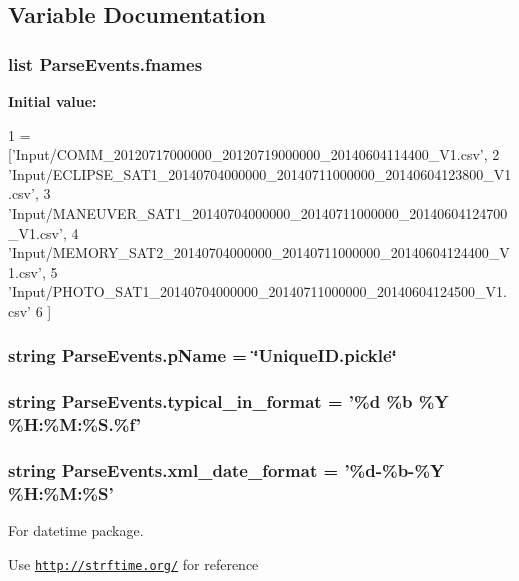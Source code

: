 \subsection{Variable Documentation}
\hypertarget{namespace_parse_events_a6718feae9a406aaacf93b9b39b2c8ff6}{
\subsubsection[{fnames}]{\setlength{\rightskip}{0pt plus 5cm}list Parse\-Events.\-fnames}}\label{namespace_parse_events_a6718feae9a406aaacf93b9b39b2c8ff6}
{\bfseries Initial value\-:}
\begin{DoxyCode}
1 = [\textcolor{stringliteral}{'Input/COMM\_20120717000000\_20120719000000\_20140604114400\_V1.csv'},
2                   \textcolor{stringliteral}{'Input/ECLIPSE\_SAT1\_20140704000000\_20140711000000\_20140604123800\_V1.csv'},
3                   \textcolor{stringliteral}{'Input/MANEUVER\_SAT1\_20140704000000\_20140711000000\_20140604124700\_V1.csv'},
4                   \textcolor{stringliteral}{'Input/MEMORY\_SAT2\_20140704000000\_20140711000000\_20140604124400\_V1.csv'},
5                   \textcolor{stringliteral}{'Input/PHOTO\_SAT1\_20140704000000\_20140711000000\_20140604124500\_V1.csv'}
6                   ]
\end{DoxyCode}
\hypertarget{namespace_parse_events_a8b2cf86e813095d3510145693bd3e7e1}{
\subsubsection[{p\-Name}]{\setlength{\rightskip}{0pt plus 5cm}string Parse\-Events.\-p\-Name = \char`\"{}Unique\-I\-D.\-pickle\char`\"{}}}\label{namespace_parse_events_a8b2cf86e813095d3510145693bd3e7e1}
\hypertarget{namespace_parse_events_a0bec8d6d94e659314b932dd430a34eec}{
\subsubsection[{typical\-\_\-in\-\_\-format}]{\setlength{\rightskip}{0pt plus 5cm}string Parse\-Events.\-typical\-\_\-in\-\_\-format = '\%d \%b \%Y \%H\-:\%M\-:\%S.\%f'}}\label{namespace_parse_events_a0bec8d6d94e659314b932dd430a34eec}
\hypertarget{namespace_parse_events_ad3060b0ae7817a67b335de758c4363ac}{
\subsubsection[{xml\-\_\-date\-\_\-format}]{\setlength{\rightskip}{0pt plus 5cm}string Parse\-Events.\-xml\-\_\-date\-\_\-format = '\%d-\/\%b-\/\%Y \%H\-:\%M\-:\%S'}}\label{namespace_parse_events_ad3060b0ae7817a67b335de758c4363ac}


For datetime package. 

Use \href{http://strftime.org/}{\tt http\-://strftime.\-org/} for reference 